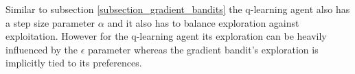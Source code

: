 Similar to subsection \ref{subsection_gradient_bandits} the q-learning agent also has a step size parameter $\alpha$ and it also has to balance exploration against exploitation. However for the q-learning agent its exploration can be heavily influenced by the $\epsilon$ parameter whereas the gradient bandit’s exploration is implicitly tied to its preferences.

